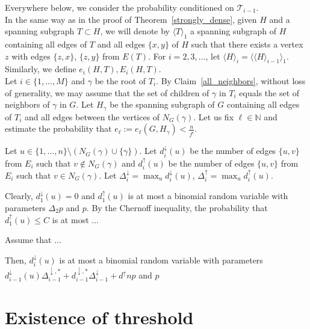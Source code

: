 \documentclass[]{article}
\begin{document}
Everywhere below, we consider the probability conditioned on $\mathcal{T}_{i-1}$.\\

In the same way as in the proof of Theorem~\ref{strongly_dense}, given $H$ and a spanning subgraph $T\subset H$, we will denote by $\langle T\rangle_1$ a spanning subgraph of $H$ containing all edges of $T$ and all edges $\{x,y\}$ of $H$ such that there exists a vertex $z$ with edges $\{z,x\}$, $\{z,y\}$ from $E(T)$. For $i=2,3,\ldots$, let $\langle H\rangle_i=\langle\langle H\rangle_{i-1}\rangle_1$. Similarly, we define $e_i(H,T),E_i(H,T)$.\\

Let $i\in\{1,\ldots,M\}$ and $\gamma$ be the root of $T_i$. By Claim~\ref{all_neighbors}, without loss of generality, we may assume that the set of children of $\gamma$ in $T_i$ equals the set of neighbors of $\gamma$ in $G$. Let $H_{\gamma}$ be the spanning subgraph of $G$ containing all edges of $T_i$ and all edges between the vertices of $N_G(\gamma)$. Let us fix $\ell\in\mathbb{N}$ and estimate the probability that $e_{\ell}:=e_{\ell}(G,H_{\gamma})<\frac{n}{f^i}$.

Let $u\in\{1,\ldots,n\}\setminus(N_G(\gamma)\cup\{\gamma\})$. Let $d^{\downarrow}_i(u)$ be the number of edges $\{u,v\}$ from $E_i$ such that $v\notin N_G(\gamma)$ and $d^{\uparrow}_i(u)$ be the number of edges $\{u,v\}$ from $E_i$ such that $v\in N_G(\gamma)$. Let $\Delta^{\downarrow}_i=\max_u d^{\downarrow}_i(u)$, $\Delta^{\uparrow}_i=\max_u d_i^{\uparrow}(u)$. 

Clearly, $d^{\downarrow}_1(u)=0$ and $d^{\uparrow}_1(u)$ is at most a binomial random variable with parameters $\Delta_2p$ and $p$. By the Chernoff inequality, the probability that $d^{\uparrow}_1(u)\leq C$ is at most ...

Assume that ...

Then, $d^{\downarrow}_i(u)$ is at most a binomial random variable with parameters $d^{\downarrow}_{i-1}(u)\Delta^{\downarrow,*}_{i-1}+d^{\downarrow,*}_{i-1}\Delta^{\downarrow}_{i-1}+d^{\uparrow}np$ and $p$




\section{Existence of threshold}
\label{threshold}
\end{document}

